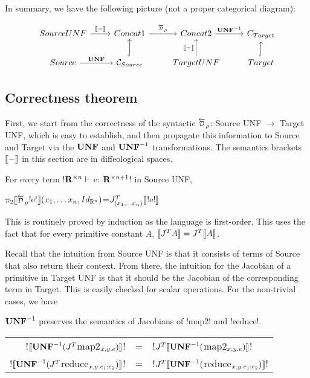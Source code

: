 In summary, we have the following picture (not a proper categorical diagram):

\[
\begin{tikzcd}
    SourceUNF \ar[r,"\sem{-}"] & Concat1 \ar[r,"\Dsynrevsymbol_{\rho}"] & Concat2 \ar[r,"\UNFSymbol^{-1}"] & C_{Target} \\
    Source \ar[r,"\UNFSymbol"] & \CSource \ar[u, hook] & TargetUNF \ar[u,"\sem{-}"] & Target \ar[u, hook] 
\end{tikzcd}
\]

\subsection{Correctness theorem} %
\label{sub:Correctness theorem}

First, we start from the correctness of the syntactic $\Dsynrevsymbol_{\rho}$: Source UNF $\to$ Target UNF, which is easy to establish, 
and then propagate this information to Source and Target via the $\mathbf{UNF}$ and $\mathbf{UNF}^{-1}$ transformations. 
The semantics brackets $\llbracket -\rrbracket$ in this section are in diffeological spaces.

\begin{proposition}
    For every term !$\mathbf{R}^{\times n} \vdash$ e: $\mathbf{R}^{\times n+1}$! in Source UNF,
    \begin{center}
        $\pi_2 \seml \Dsynrevsymbol_{\rho}$!e!$\rrbracket(x_1,\ldots x_n,Id_{\mathbb{R}^n})$=$J^T_{(x_1,\ldots x_n)}\llbracket$!e!$\rrbracket$
    \end{center} 
\end{proposition}

This is routinely proved by induction as the language is first-order. 
This uses the fact that for every primitive constant $A$, $\llbracket J^TA\rrbracket=J^T\llbracket A\rrbracket$.

Recall that the intuition from Source UNF is that it consists of terms of Source that also return their context.
From there, the intuition for the Jacobian of a primitive in Target UNF is that it should be the Jacobian of
the corresponding term in Target. This is easily checked for scalar operations. 
For the non-trivial cases, we have 

\begin{proposition}
$\mathbf{UNF}^{-1}$ preserves the semantics of Jacobians of !map2! and !reduce!.
    \begin{center}
\begin{tabular}{r c l}
    !$\llbracket\mathbf{UNF}^{-1}(J^T$map2$_{x,y.e})\rrbracket$! &=& !$J^T\llbracket\mathbf{UNF}^{-1}($map2$_{x,y.e})\rrbracket$!\\
    !$\llbracket\mathbf{UNF}^{-1}(J^T$reduce$_{x,y.e_1;e_2})\rrbracket$! &=& !$J^T\llbracket\mathbf{UNF}^{-1}($reduce$_{x,y.e_1;e_2})\rrbracket$!
\end{tabular}
\end{center}
\end{proposition}

